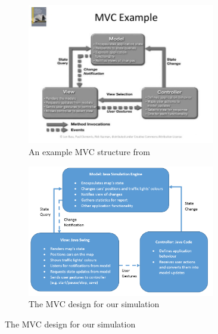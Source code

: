 \documentclass{article}
\begin{document}
	\begin{figure}[p]
		\centering
		\begin{subfigure}{\textwidth}
			\centering
			\includegraphics[width=0.9\textwidth]{MVCExample.jpg}
			\caption{An example MVC structure from \cite{bass2007software}}
		\end{subfigure}	
		\par \bigskip
		\begin{subfigure}{\textwidth}
			\centering
			\includegraphics[width=0.9\textwidth]{mvc}
			\caption{The MVC design for our simulation}
			\label{OurMvc}
		\end{subfigure}
		
		
	\end{figure}
	
\end{document}

